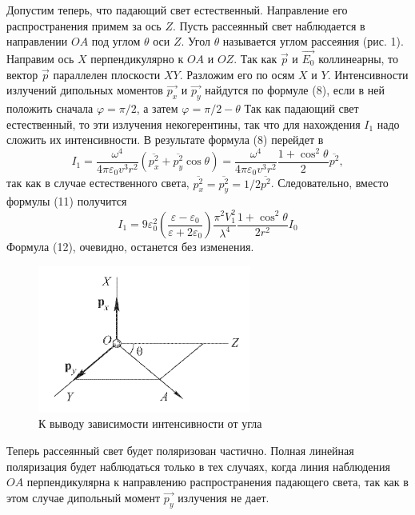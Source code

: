 \documentclass[14pt]{article}
\begin{document}
Допустим теперь, что падающий свет естественный. Направление его распространения примем за ось $Z$. Пусть рассеянный свет наблюдается в направлении $OA$ под углом $\theta$ оси $Z$. Угол $\theta$ называется углом рассеяния (рис. 1). Направим ось $X$ перпендикулярно к $OA$ и $OZ$. Так как $\vec{p}$ и $\vec{E_0}$ коллинеарны, то вектор $\vec{p}$ параллелен плоскости $XY$. Разложим его по осям $X$ и $Y$. Интенсивности излучений дипольных моментов $\vec{p_x}$ и $\vec{p_y}$ найдутся по формуле (8), если в ней положить сначала $\varphi = \pi/2$, а затем $\varphi = \pi/2 - \theta$ Так как падающий свет естественный, то эти излучения некогерентины, так что для нахождения $I_1$ надо сложить их интенсивности. В результате формула (8) перейдет в
$$
	I_1 =   \frac{\omega^4}{4\pi\varepsilon_0v^3r^2}(\overline{p_x^2} + \overline{p_y^2}\cos\theta) = 
			\frac{\omega^4}{4\pi\varepsilon_0v^3r^2}\frac{1+\cos^2\theta}{2}\overline{p^2},
$$
так как в случае естественного света, $\overline{p_x^2} = \overline{p_y^2} = 1/2\overline{p^2}$. Следовательно, вместо формулы (11) получится
\begin{equation}
	I_1 = 9\varepsilon_0^2\left(\frac{\varepsilon - \varepsilon_0}{\varepsilon + 2\varepsilon_0}\right)\frac{\pi^2V_1^2}{\lambda^4}\frac{1+\cos^2\theta}{2r^2}I_0
\end{equation}
Формула (12), очевидно, останется без изменения.

\begin{figure}
\centering
	\includegraphics[width=7cm]{1.png}
	\caption{К выводу зависимости интенсивности от угла}
\end{figure}

Теперь рассеянный свет будет поляризован частично. Полная линейная поляризация будет наблюдаться только в тех случаях, когда линия наблюдения $OA$ перпендикулярна к направлению распространения падающего света, так как в этом случае дипольный момент $\vec{p_y}$ излучения не дает. 
\end{document}
